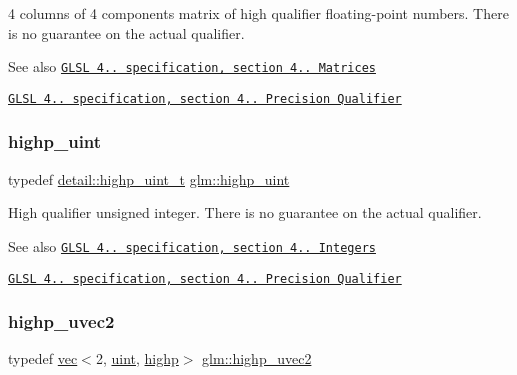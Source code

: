 4 columns of 4 components matrix of high qualifier floating-\/point numbers. There is no guarantee on the actual qualifier.

\begin{DoxySeeAlso}{See also}
\href{http://www.opengl.org/registry/doc/GLSLangSpec.4.20.8.pdf}{\tt G\+L\+SL 4.. specification, section 4.. Matrices} 

\href{http://www.opengl.org/registry/doc/GLSLangSpec.4.20.8.pdf}{\tt G\+L\+SL 4.. specification, section 4.. Precision Qualifier} 
\end{DoxySeeAlso}
\mbox{\label{group__core__precision_gabfd1cf11193324a5f77d3831b6ac3205}} 
\subsubsection{\texorpdfstring{highp\+\_\+uint}{highp\_uint}}
{\footnotesize\ttfamily typedef \mbox{\hyperlink{namespaceglm_1_1detail_a994c05c8a976cc902a7cd193ad36bbba}{detail\+::highp\+\_\+uint\+\_\+t}} \mbox{\hyperlink{group__core__precision_gabfd1cf11193324a5f77d3831b6ac3205}{glm\+::highp\+\_\+uint}}}

High qualifier unsigned integer. There is no guarantee on the actual qualifier.

\begin{DoxySeeAlso}{See also}
\href{http://www.opengl.org/registry/doc/GLSLangSpec.4.20.8.pdf}{\tt G\+L\+SL 4.. specification, section 4.. Integers} 

\href{http://www.opengl.org/registry/doc/GLSLangSpec.4.20.8.pdf}{\tt G\+L\+SL 4.. specification, section 4.. Precision Qualifier} 
\end{DoxySeeAlso}
\mbox{\label{group__core__precision_ga34aca1cdf2130b1179fd7c5554bc1883}} 
\subsubsection{\texorpdfstring{highp\+\_\+uvec2}{highp\_uvec2}}
{\footnotesize\ttfamily typedef \mbox{\hyperlink{structglm_1_1vec}{vec}}$<$2, \mbox{\hyperlink{group__core__precision_ga4fd29415871152bfb5abd588334147c8}{uint}}, \mbox{\hyperlink{namespaceglm_a36ed105b07c7746804d7fdc7cc90ff25ac6f7eab42eacbb10d59a58e95e362074}{highp}}$>$ \mbox{\hyperlink{group__core__precision_ga34aca1cdf2130b1179fd7c5554bc1883}{glm\+::highp\+\_\+uvec2}}}

